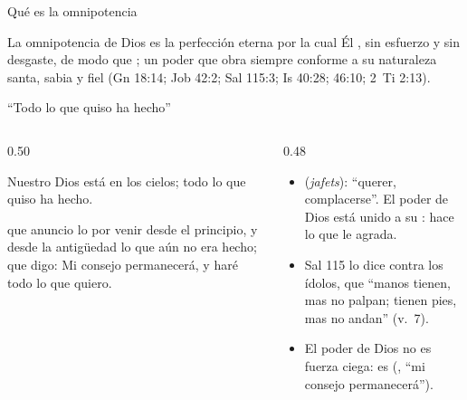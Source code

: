 \begin{frame}{Qué es la omnipotencia}
\begin{tcolorbox}[colback=papiro,colframe=azul,boxrule=1pt,arc=3pt]
\small La omnipotencia de Dios es la perfección eterna por la cual Él , sin esfuerzo y sin desgaste, de modo que ; un poder que obra siempre conforme a su naturaleza santa, sabia y fiel (Gn 18:14; Job 42:2; Sal 115:3; Is 40:28; 46:10; 2~Ti 2:13).
\end{tcolorbox}
\centering
{}
\end{frame}

\begin{frame}{``Todo lo que quiso ha hecho''}
\begin{columns}[t,onlytextwidth]
\begin{column}{0.50\textwidth}
\begin{center}\small{}\end{center}
\begin{cita}Nuestro Dios está en los cielos; todo lo que quiso ha hecho.\end{cita}
\begin{cita}[fontupper=\scriptsize\itshape]que anuncio lo por venir desde el principio, y desde la antigüedad lo que aún no era hecho; que digo: Mi consejo permanecerá, y haré todo lo que quiero.\end{cita}
\end{column}
\begin{column}{0.48\textwidth}\small
\begin{itemize}
\item {} (\emph{jafets}): ``querer, complacerse''. El poder de Dios está unido a su : hace lo que le agrada.
\item Sal 115 lo dice contra los ídolos, que ``manos tienen, mas no palpan; tienen pies, mas no andan'' (v.~7).
\item El poder de Dios no es fuerza ciega: es  (, ``mi consejo permanecerá'').
\end{itemize}
\end{column}
\end{columns}
\end{frame}

